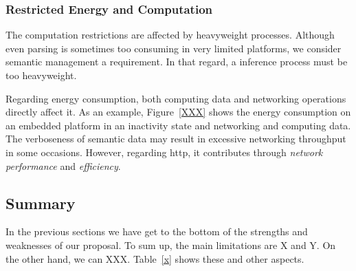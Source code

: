 \subsubsection{Restricted Energy and Computation}

The computation restrictions are affected by heavyweight processes.
Although even parsing is sometimes too consuming in very limited platforms,
we consider semantic management a requirement.
In that regard, a inference process must be too heavyweight. %

Regarding energy consumption, both computing data and networking operations directly affect it.
As an example, Figure~\ref{XXX} shows the energy consumption on an embedded platform in an inactivity state and networking and computing data. %
The verboseness of semantic data may result in excessive networking throughput in some occasions.
However, regarding \ac{http}, it contributes through \emph{network performance} and \emph{efficiency}.




\subsection{Summary}
\label{sec:middleware_eval_summary}

In the previous sections we have get to the bottom of the strengths and weaknesses of our proposal.
To sum up, the main limitations are X and Y.
On the other hand, we can XXX.
Table~\ref{x} shows these and other aspects.

%
%
